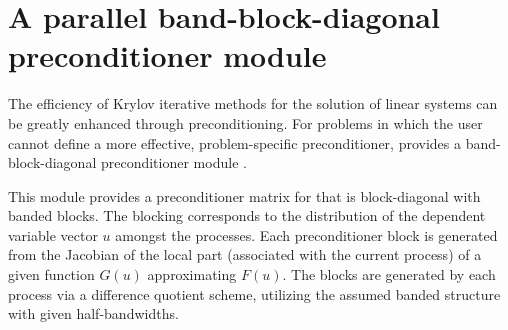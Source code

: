 \section{A parallel band-block-diagonal preconditioner module}
\label{sss:kinbbdpre}
The efficiency of Krylov iterative methods for the solution of linear systems 
can be greatly enhanced through preconditioning. For problems in which the 
user cannot define a more effective, problem-specific preconditioner,
{\kinsol} provides a band-block-diagonal preconditioner module {\kinbbdpre}.

This module provides a preconditioner matrix for {\kinsol} that
is block-diagonal with banded blocks. The blocking corresponds
to the distribution of the dependent variable vector $u$ amongst
the processes. Each preconditioner block is generated from
the Jacobian of the local part (associated with the current
process) of a given function $G(u)$ approximating $F(u)$. The blocks
are generated by each process via a difference quotient scheme,
utilizing the assumed banded structure with given
half-bandwidths.

